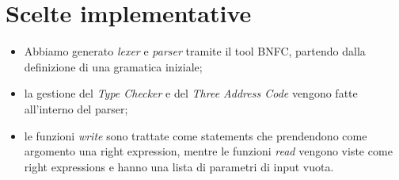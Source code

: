 \documentclass[12pt]{article}
\begin{document}
\section{Scelte implementative}
\begin{itemize}
\item Abbiamo generato \textit{lexer} e \textit{parser} tramite il tool BNFC, partendo dalla definizione di una gramatica iniziale;
\item la gestione del \textit{Type Checker} e del \textit{Three Address Code} vengono fatte all'interno del parser;
\item le funzioni \textit{write} sono trattate come statements che prendendono come argomento una right expression, mentre le funzioni \textit{read} vengono viste come right expressions e hanno una lista di parametri di input vuota.

\end{itemize}
\end{document}
